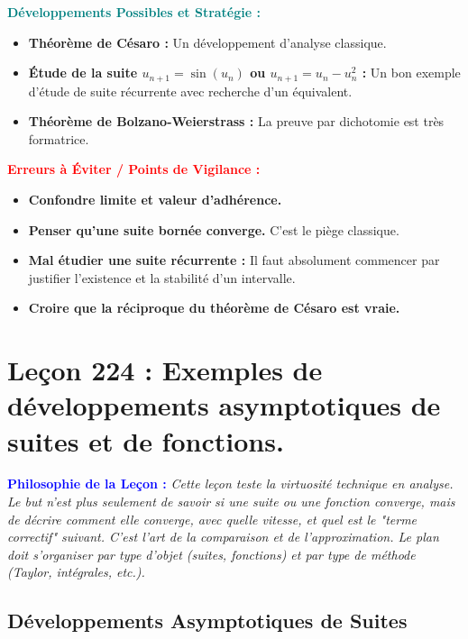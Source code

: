 \documentclass[12pt, a4paper, parskip=full]{report}
\theoremstyle{agregstyle}
\newenvironment{philosophie}
  {\par\medskip\noindent\begin{oframed}\noindent\textbf{\textcolor{blue}{Philosophie de la Leçon :}}\itshape}
  {\end{oframed}\par\medskip}
\newenvironment{developpements}
  {\par\medskip\noindent\begin{oframed}\noindent\textbf{\textcolor{teal}{Développements Possibles et Stratégie :}}}
  {\end{oframed}\par\medskip}
\newenvironment{erreurs}
  {\par\medskip\noindent\begin{oframed}\noindent\textbf{\textcolor{red}{Erreurs à Éviter / Points de Vigilance :}}}
  {\end{oframed}\par\medskip}
\begin{document}
\begin{developpements}
    \begin{itemize}
        \item \textbf{Théorème de Césaro :} Un développement d'analyse classique.
        \item \textbf{Étude de la suite $u_{n+1} = \sin(u_n)$ ou $u_{n+1} = u_n - u_n^2$ :} Un bon exemple d'étude de suite récurrente avec recherche d'un équivalent.
        \item \textbf{Théorème de Bolzano-Weierstrass :} La preuve par dichotomie est très formatrice.
    \end{itemize}
\end{developpements}

\begin{erreurs}
    \begin{itemize}
        \item \textbf{Confondre limite et valeur d'adhérence.}
        \item \textbf{Penser qu'une suite bornée converge.} C'est le piège classique.
        \item \textbf{Mal étudier une suite récurrente :} Il faut absolument commencer par justifier l'existence et la stabilité d'un intervalle.
        \item \textbf{Croire que la réciproque du théorème de Césaro est vraie.}
    \end{itemize}
\end{erreurs}
\chapter{Leçon 224 : Exemples de développements asymptotiques de suites et de fonctions.}

\begin{philosophie}
    Cette leçon teste la virtuosité technique en analyse. Le but n'est plus seulement de savoir si une suite ou une fonction converge, mais de décrire \textit{comment} elle converge, avec quelle vitesse, et quel est le "terme correctif" suivant. C'est l'art de la comparaison et de l'approximation. Le plan doit s'organiser par type d'objet (suites, fonctions) et par type de méthode (Taylor, intégrales, etc.).
\end{philosophie}

\section{Développements Asymptotiques de Suites}
\end{document}
